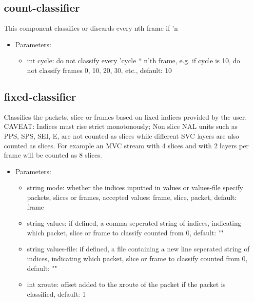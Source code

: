 \subsection{count-classifier}
This component classifies or discards every nth frame if 'n %
\begin{itemize}
\item Parameters:
\begin{itemize}
\item int cycle: do not classify every 'cycle * n'th frame, e.g. if cycle is 10, do not classify frames 0, 10, 20, 30, etc., default: 10
\end{itemize}
\end{itemize}
\subsection{fixed-classifier}
Classifies the packets, slice or frames based on fixed indices provided by the user. CAVEAT: Indices must rise strict monotonously; Non slice NAL units such as PPS, SPS, SEI, E, are not counted as slices while different SVC layers are also counted as slices. For example an MVC stream with 4 slices and with 2 layers per frame will be counted as 8 slices.
\begin{itemize}
\item Parameters:
\begin{itemize}
\item string mode: whether the indices inputted in values or values-file specify packets, slices or frames, accepted values: frame, slice, packet, default: frame
\item string values: if defined, a comma seperated string of indices, indicating which packet, slice or frame to classify counted from 0, default: ""
\item string values-file: if defined, a file containing a new line seperated string of indices, indicating which packet, slice or frame to classify counted from 0, default: ""
\item int xroute: offset added to the xroute of the packet if the packet is classified, default: 1
\end{itemize}
\end{itemize}
